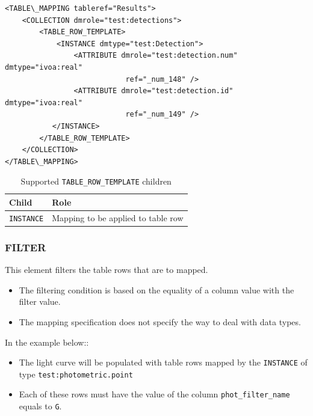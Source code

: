 \documentclass[11pt,a4paper]{ivoa}
\begin{document}
\begin{lstlisting}[caption={TABLE\_ROW\_TEMPLATE examples},style=XML]
<TABLE\_MAPPING tableref="Results">
    <COLLECTION dmrole="test:detections">
        <TABLE_ROW_TEMPLATE>
            <INSTANCE dmtype="test:Detection">
                <ATTRIBUTE dmrole="test:detection.num" dmtype="ivoa:real"
                            ref="_num_148" />
                <ATTRIBUTE dmrole="test:detection.id" dmtype="ivoa:real"
                            ref="_num_149" />
           </INSTANCE>
        </TABLE_ROW_TEMPLATE>
    </COLLECTION>
</TABLE\_MAPPING>
\end{lstlisting}

\begin{table}[!htbp]
\small
\centering
\begin{tabulary}{\linewidth}{|L|J|}
       \hline  
          \textbf{Child} &  
          \textbf{Role}\\
       \hline  
          \texttt{INSTANCE}    & 
          Mapping to be applied to table row \\       
       \hline 
     \end{tabulary}
     \caption{Supported  \texttt{TABLE\_ROW\_TEMPLATE} children} 
     \label{trt:row-children}
\end{table}
\FloatBarrier


%
%

\subsubsection{FILTER}
This element filters the table rows that are to mapped. 

\begin{itemize}
   \item The filtering condition is based on the equality of a column value with the filter value.
   \item The mapping specification does not specify the way to deal with data types.
\end{itemize}

In the example below::

\begin{itemize}
   \item The light curve will be populated with table rows mapped by the \texttt{INSTANCE} of type \texttt{test:photometric.point}
   \item Each of these rows must have the value of the column \texttt{phot\_filter\_name} equals to \texttt{G}.
\end{itemize}
\end{document}
